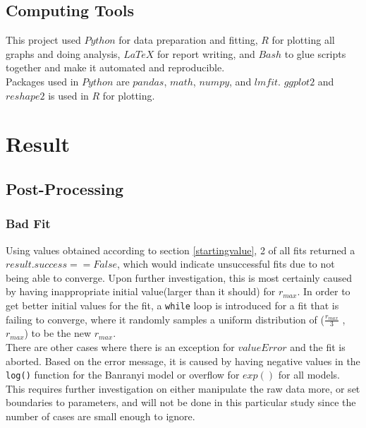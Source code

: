 \documentclass[11pt]{article}
\begin{document}
\subsection{Computing Tools}
This project used $Python$ for data preparation and fitting, $R$ for plotting all graphs and doing analysis, $LaTeX$ for report writing, and $Bash$ to glue scripts together and make it automated and reproducible.\\
Packages used in $Python$ are $pandas$, $math$, $numpy$, and $lmfit$. $ggplot2$ and $reshape2$ is used in $R$ for plotting.

\section{Result}
\subsection{Post-Processing}
\subsubsection{Bad Fit}
Using values obtained according to section \ref{startingvalue}, 2 of all fits returned a $result.success == False$, which would indicate unsuccessful fits due to not being able to converge. Upon further investigation, this is most certainly caused by having inappropriate initial value(larger than it should) for $r_{max}$. In order to get better initial values for the fit, a \verb|while| loop is introduced for a fit that is failing to converge, where it randomly samples a uniform distribution of ($\frac{r_{max}}{3}$ , $r_{max}$) to be the new $r_{max}$.\\
There are other cases where there is an exception for $valueError$ and the fit is aborted. Based on the error message, it is caused by having negative values in the \verb|log()| function for the Banranyi model or overflow for $exp()$ for all  models. This requires further investigation on either manipulate the raw data more, or set boundaries to parameters, and will not be done in this particular study since the number of cases are small enough to ignore.
\end{document}
